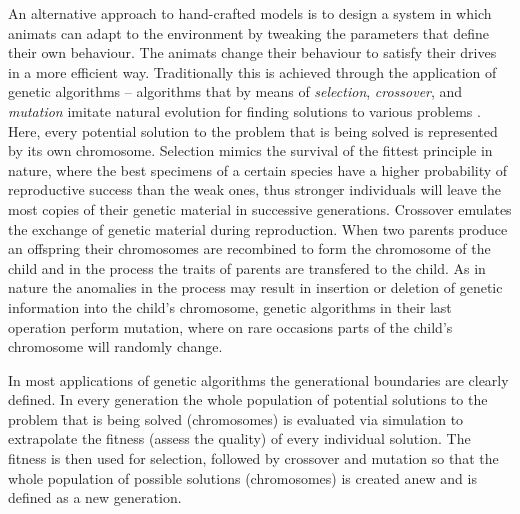 An alternative approach to hand-crafted models is to design a system in which animats can adapt to the environment by tweaking the parameters that define their own behaviour. The animats change their behaviour to satisfy their drives in a more efficient way. Traditionally this is achieved through the application of genetic algorithms -- algorithms that by means of \emph{selection}, \emph{crossover}, and \emph{mutation} imitate natural evolution for finding solutions to various problems \cite{goldberg1989genetic,goldberg2002design,holland1992adaptation}. Here, every potential solution to the problem that is being solved is represented by its own chromosome. Selection mimics the survival of the fittest principle in nature, where the best specimens of a certain species have a higher probability of reproductive success than the weak ones, thus stronger individuals will leave the most copies of their genetic material in successive generations. Crossover emulates the exchange of genetic material during reproduction. When two parents produce an offspring their chromosomes are recombined to form the chromosome of the child and in the process the traits of parents are transfered to the child. As in nature the anomalies in the process may result in insertion or deletion of genetic information into the child's chromosome, genetic algorithms in their last operation perform mutation, where on rare occasions parts of the child's chromosome will randomly change.

In most applications of genetic algorithms the generational boundaries are clearly defined. In every generation the whole population of potential solutions to the problem that is being solved (chromosomes) is evaluated via simulation to extrapolate the fitness (assess the quality) of every individual solution. The fitness is then used for selection, followed by crossover and mutation so that the whole population of possible solutions (chromosomes) is created anew and is defined as a new generation.

